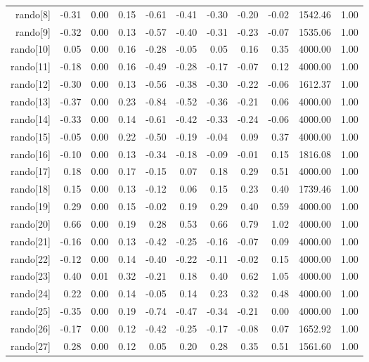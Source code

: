 \begin{table}[ht]
\begin{tabular}{rrrrrrrrrrr}
  rando[8] & -0.31 & 0.00 & 0.15 & -0.61 & -0.41 & -0.30 & -0.20 & -0.02 & 1542.46 & 1.00 \\ 
  rando[9] & -0.32 & 0.00 & 0.13 & -0.57 & -0.40 & -0.31 & -0.23 & -0.07 & 1535.06 & 1.00 \\ 
  rando[10] & 0.05 & 0.00 & 0.16 & -0.28 & -0.05 & 0.05 & 0.16 & 0.35 & 4000.00 & 1.00 \\ 
  rando[11] & -0.18 & 0.00 & 0.16 & -0.49 & -0.28 & -0.17 & -0.07 & 0.12 & 4000.00 & 1.00 \\ 
  rando[12] & -0.30 & 0.00 & 0.13 & -0.56 & -0.38 & -0.30 & -0.22 & -0.06 & 1612.37 & 1.00 \\ 
  rando[13] & -0.37 & 0.00 & 0.23 & -0.84 & -0.52 & -0.36 & -0.21 & 0.06 & 4000.00 & 1.00 \\ 
  rando[14] & -0.33 & 0.00 & 0.14 & -0.61 & -0.42 & -0.33 & -0.24 & -0.06 & 4000.00 & 1.00 \\ 
  rando[15] & -0.05 & 0.00 & 0.22 & -0.50 & -0.19 & -0.04 & 0.09 & 0.37 & 4000.00 & 1.00 \\ 
  rando[16] & -0.10 & 0.00 & 0.13 & -0.34 & -0.18 & -0.09 & -0.01 & 0.15 & 1816.08 & 1.00 \\ 
  rando[17] & 0.18 & 0.00 & 0.17 & -0.15 & 0.07 & 0.18 & 0.29 & 0.51 & 4000.00 & 1.00 \\ 
  rando[18] & 0.15 & 0.00 & 0.13 & -0.12 & 0.06 & 0.15 & 0.23 & 0.40 & 1739.46 & 1.00 \\ 
  rando[19] & 0.29 & 0.00 & 0.15 & -0.02 & 0.19 & 0.29 & 0.40 & 0.59 & 4000.00 & 1.00 \\ 
  rando[20] & 0.66 & 0.00 & 0.19 & 0.28 & 0.53 & 0.66 & 0.79 & 1.02 & 4000.00 & 1.00 \\ 
  rando[21] & -0.16 & 0.00 & 0.13 & -0.42 & -0.25 & -0.16 & -0.07 & 0.09 & 4000.00 & 1.00 \\ 
  rando[22] & -0.12 & 0.00 & 0.14 & -0.40 & -0.22 & -0.11 & -0.02 & 0.15 & 4000.00 & 1.00 \\ 
  rando[23] & 0.40 & 0.01 & 0.32 & -0.21 & 0.18 & 0.40 & 0.62 & 1.05 & 4000.00 & 1.00 \\ 
  rando[24] & 0.22 & 0.00 & 0.14 & -0.05 & 0.14 & 0.23 & 0.32 & 0.48 & 4000.00 & 1.00 \\ 
  rando[25] & -0.35 & 0.00 & 0.19 & -0.74 & -0.47 & -0.34 & -0.21 & 0.00 & 4000.00 & 1.00 \\ 
  rando[26] & -0.17 & 0.00 & 0.12 & -0.42 & -0.25 & -0.17 & -0.08 & 0.07 & 1652.92 & 1.00 \\ 
  rando[27] & 0.28 & 0.00 & 0.12 & 0.05 & 0.20 & 0.28 & 0.35 & 0.51 & 1561.60 & 1.00 \\ 

\end{tabular}
\end{table}
